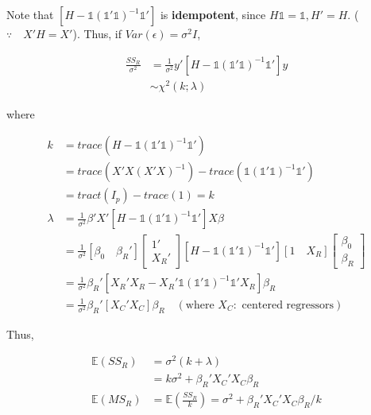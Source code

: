 \documentclass[12pt]{article}
\begin{document}
Note that $[H - \mathds{1} (\mathds{1}' \mathds{1})^{-1} \mathds{1} ']$ is \textbf{idempotent}, since $H \mathds{1} = \mathds{1}, H' = H$. ($\because \quad X'H = X'$). Thus, if $Var(\epsilon) = \sigma^2 I$,

$$
\begin{aligned}
\frac{SS_R}{\sigma^2} &= \frac{1}{\sigma^2} y'[H - \mathds{1} (\mathds{1}' \mathds{1})^{-1} \mathds{1}' ] y \\
&\sim \chi^2 (k; \lambda)
\end{aligned}
$$

where 

$$
\begin{aligned}
k &= trace \left( H - \mathds{1} (\mathds{1}' \mathds{1})^{-1} \mathds{1}'  \right) \\[8pt]
&= trace(X'X (X'X)^{-1}) - trace(\mathds{1} (\mathds{1}' \mathds{1})^{-1} \mathds{1}') \\[8pt]
&= tract(I_p) - trace(1) = k \\[10pt]
\lambda &= \frac{1}{\sigma^2} \beta' X' \left[ H - \mathds{1} (\mathds{1}' \mathds{1})^{-1} \mathds{1}' \right] X \beta \\[8pt]
&= \frac{1}{\sigma^2} \left[ \beta_0 \quad \beta_R' \right] \begin{bmatrix} 1' \\ X_R'\end{bmatrix}
\left[ H - \mathds{1} (\mathds{1}' \mathds{1})^{-1} \mathds{1}' \right] \left[ 1 \quad X_R \right] \begin{bmatrix} \beta_0 \\ \beta_R \end{bmatrix} \\[8pt]
&=\frac{1}{\sigma^2}\beta_R' [X_R' X_R - X_R'  \mathds{1} (\mathds{1}' \mathds{1})^{-1} \mathds{1}' X_R] \beta_R \\[8pt]
&= \frac{1}{\sigma^2}\beta_R' [X_C' X_C] \beta_R \quad (\text{where } X_C : \text{ centered regressors})
\end{aligned}
$$

Thus,

$$
\begin{aligned}
\mathbb{E} (SS_R) &= \sigma^2 \left( k + \lambda \right) \\[8pt]
&= k \sigma^2 + \beta_R' X_C' X_C \beta_R \\[10pt]
\mathbb{E} (MS_R) &= \mathbb{E} \left( \frac{SS_R}{k} \right) = \sigma^2 + \beta_R' X_C' X_C \beta_R /k
\end{aligned}
$$
\end{document}
